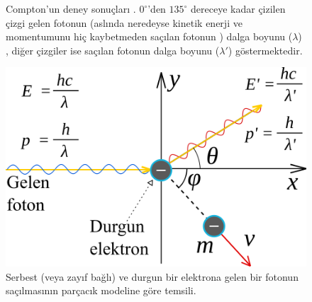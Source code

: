 \documentclass[a4paper,12pt, twoside]{article}
\begin{document}
\begin{figure}[hbtp]
\begin{minipage}{0.45\textwidth}
{%
\caption{Compton'un deney sonuçları \cite{Compton1923, book:EisbergResnick, web:hyperphysics_compton}. $0^\circ$'den $135^\circ$ dereceye kadar çizilen çizgi gelen fotonun (aslında neredeyse kinetik enerji ve momentumunu hiç kaybetmeden saçılan fotonun \cite{web:hyperphysics_compton}) dalga boyunu ($\lambda$) , diğer çizgiler ise saçılan fotonun dalga boyunu ($\lambda'$) göstermektedir.}
\label{fig:compton_exp}}
\end{minipage}
\hspace{12pt}
\begin{minipage}{0.54\textwidth}
{\center
\includegraphics[scale=1.2]{Compton_effect_illust.png}
\caption{Serbest (veya zayıf bağlı) ve durgun bir elektrona gelen bir fotonun saçılmasının parçacık modeline göre temsili.}
\label{fig:compton_duzenek}}

\vspace{12pt}


\end{minipage}
\end{figure}
\end{document}

